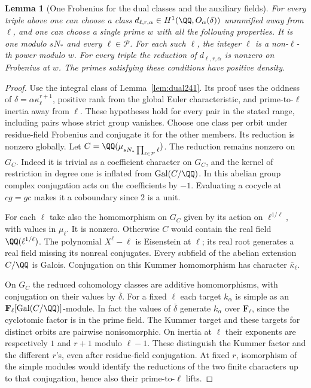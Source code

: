 \documentclass[a4paper,11pt]{article}
\newtheorem{lemma}[proposition]{Lemma}
\theoremstyle{definition}
\theoremstyle{remark}
\numberwithin{equation}{section}
\begin{document}
\begin{lemma}[One Frobenius for the dual classes and the auxiliary fields]\leavevmode
\label{lem:jointfrobenius416}
For every triple above one can choose a class
\(d_{\ell,r,\alpha}\in H^1(\QQ,O_\alpha(\delta))\) unramified
away from \(\ell\), and one can choose a single prime \(w\) with
all the following properties. It is one modulo \(sN_*\) and every
\(\ell\in\mathcal P\). For each such \(\ell\), the integer \(\ell\)
is a non-\(\ell\)-th power modulo \(w\). For every triple the
reduction of \(d_{\ell,r,\alpha}\) is nonzero on Frobenius at \(w\).
The primes satisfying these conditions have positive density.
\end{lemma}
\begin{proof}
Use the integral class of Lemma~\ref{lem:dual241}. Its proof
uses the oddness of \(\delta=\alpha\kappa_\ell^{r+1}\), positive
rank from the global Euler characteristic, and prime-to-\(\ell\)
inertia away from \(\ell\). These hypotheses hold for every pair
in the stated range, including pairs whose strict group vanishes.
Choose one class per orbit under residue-field Frobenius and
conjugate it for the other members. Its reduction is nonzero
globally. Let \(C=\QQ(\mu_{sN_*\prod_{\ell\in\mathcal P}\ell})\).
The reduction remains nonzero on \(G_C\). Indeed it is trivial
as a coefficient character on \(G_C\), and the kernel of
restriction in degree one is inflated from
\(\operatorname{Gal}(C/\QQ)\). In this abelian group complex
conjugation acts on the coefficients by \(-1\). Evaluating a
cocycle at \(cg=gc\) makes it a coboundary since \(2\) is a
unit.

For each \(\ell\) take also the homomorphism on \(G_C\) given
by its action on \(\ell^{1/\ell}\), with values in \(\mu_\ell\).
It is nonzero. Otherwise \(C\) would contain the real field
\(\QQ(\ell^{1/\ell})\). The polynomial \(X^\ell-\ell\) is
Eisenstein at \(\ell\); its real root generates a real field
missing its nonreal conjugates. Every subfield of the abelian
extension \(C/\QQ\) is Galois. Conjugation on this Kummer
homomorphism has character \(\bar\kappa_\ell\).

On \(G_C\) the reduced cohomology classes are additive
homomorphisms, with conjugation on their values by
\(\bar\delta\). For a fixed \(\ell\) each target \(k_\alpha\)
is simple as an \(\mathbf F_\ell[\operatorname{Gal}(C/\QQ)]\)-module.
In fact the values of \(\bar\delta\) generate \(k_\alpha\) over
\(\mathbf F_\ell\), since the cyclotomic factor is in the prime
field. The Kummer target and these targets for distinct orbits
are pairwise nonisomorphic. On inertia at \(\ell\) their
exponents are respectively \(1\) and \(r+1\) modulo \(\ell-1\).
These distinguish the Kummer factor and the different \(r\)'s,
even after residue-field conjugation. At fixed \(r\), isomorphism
of the simple modules would identify the reductions of the two
finite characters up to that conjugation, hence also their
prime-to-\(\ell\) lifts.


\end{proof}
\end{document}
